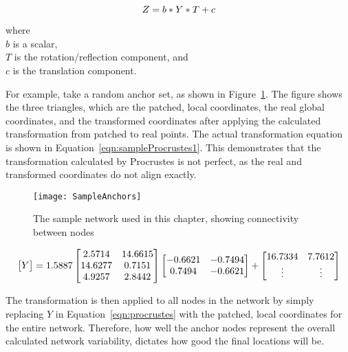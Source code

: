 \begin{equation}\label{eqn:procrustes}
Z = b*Y*T + c \\
\end{equation}
\begin{flushright}
where \\
$b$ is a scalar, \\
$T$ is the rotation/reflection component, and\\
$c$ is the translation component.
\end{flushright}

For example, take a random anchor set, as shown in Figure~\ref{fig:sampleProcrustes1}.  The figure shows the three triangles, which are the patched, local coordinates, the real global coordinates, and the transformed coordinates after applying the calculated transformation from patched to real points.  The actual transformation equation is shown in Equation~\ref{eqn:sampleProcrustes1}.  This demonstrates that the transformation calculated by Procrustes is not perfect, as the real and transformed coordinates do not align exactly.

\begin{figure}
	\centering
		\texttt{[image: SampleAnchors]}
	\caption{The sample network used in this chapter, showing connectivity between nodes}
	\label{fig:sampleProcrustes1}
\end{figure}

\begin{equation}\label{eqn:sampleProcrustes1}
\begin{bmatrix}$$Y$$\end{bmatrix} = 
1.5887 
\begin{bmatrix}$$
	2.5714   & 14.6615 \\
   14.6277   &  0.7151 \\
    4.9257   &  2.8442$$\end{bmatrix}
\begin{bmatrix}$$
	-0.6621  & -0.7494 \\
    0.7494   & -0.6621$$\end{bmatrix} + 
\begin{bmatrix}$$
16.7334 & 7.7612 \\ 
\vdots & \vdots$$\end{bmatrix}
\end{equation}

The transformation is then applied to all nodes in the network by simply replacing $Y$ in Equation~\ref{eqn:procrustes} with the patched, local coordinates for the entire network. Therefore, how well the anchor nodes represent the overall calculated network variability, dictates how good the final locations will be.

